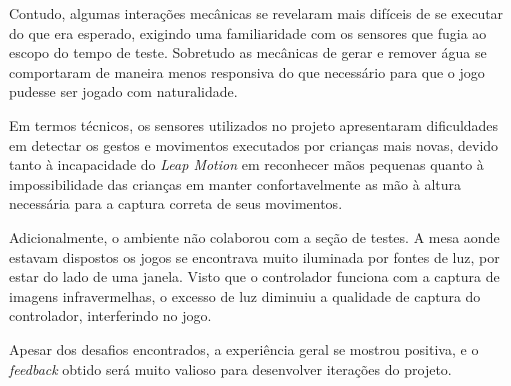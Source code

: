 Contudo, algumas interações mecânicas se revelaram mais difíceis de se 
executar do que era esperado, exigindo uma familiaridade com os sensores 
que fugia ao escopo do tempo de teste. Sobretudo as mecânicas de gerar e 
remover água se comportaram de maneira menos responsiva do que necessário 
para que o jogo pudesse ser jogado com naturalidade.

Em termos técnicos, os sensores utilizados no projeto apresentaram 
dificuldades em detectar os gestos e movimentos executados por crianças 
mais novas, devido tanto à incapacidade do \textit{Leap Motion} em 
reconhecer mãos pequenas quanto à impossibilidade das crianças em 
manter confortavelmente as mão à altura necessária para a captura 
correta de seus movimentos. 

Adicionalmente, o ambiente não colaborou com a seção de testes. A mesa 
aonde estavam dispostos os jogos se encontrava muito iluminada por 
fontes de luz, por estar do lado de uma janela. Visto que o controlador 
funciona com a captura de imagens infravermelhas, o excesso de luz 
diminuiu a qualidade de captura do controlador, interferindo no jogo.

Apesar dos desafios encontrados, a experiência geral se mostrou 
positiva, e o \textit{feedback} obtido será muito valioso para desenvolver 
iterações do projeto.

